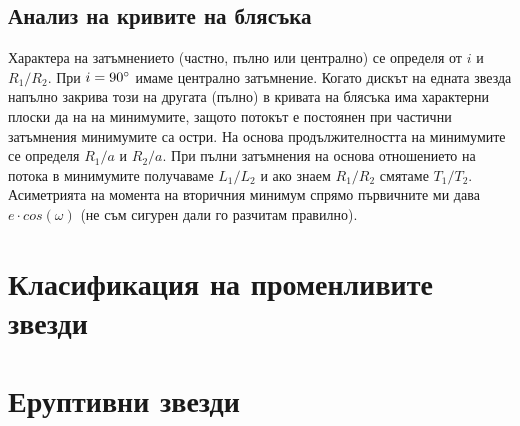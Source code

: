 \documentclass[a4paper,12pt]{article}
\begin{document}
\subsection{Анализ на кривите на блясъка}
Характера на затъмнението (частно, пълно или централно) се определя от $i$ и $R_1/R_2$. При $i=90 \degree$ имаме централно затъмнение. Когато дискът на едната звезда напълно закрива този на другата (пълно) в кривата на блясъка има характерни плоски да на на минимумите, защото потокът е постоянен при частични затъмнения минимумите са остри. На основа продължителността на минимумите се определя $R_1/a$ и $R_2/a$. При пълни затъмнения на основа отношението на потока в минимумите получаваме $L_1/L_2$ и ако знаем $R_1/R_2$ смятаме $T_1/T_2$. Асиметрията на момента на вторичния минимум спрямо първичните ми дава $e \cdot cos(\omega)$ (не съм сигурен дали го разчитам правилно).

\section{Класификация на променливите звезди}

\section{Еруптивни звезди}

\end{document}
